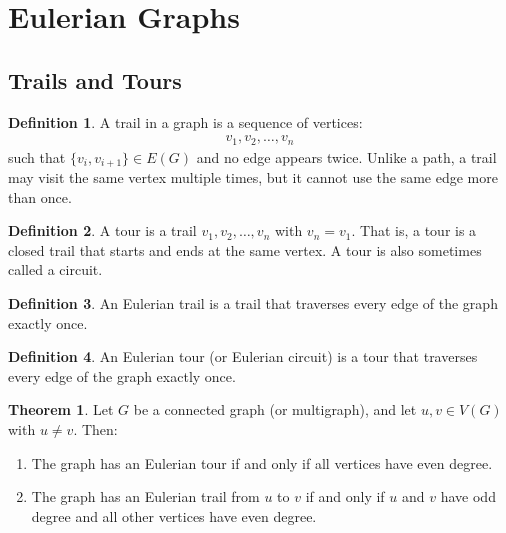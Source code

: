 \documentclass{article}
\theoremstyle{definition}
\newtheorem{theorem}{Theorem}
\newtheorem{definition}{Definition}
\begin{document}
\clearpage
\section{Eulerian Graphs}

\subsection{Trails and Tours}

\begin{definition}
A trail in a graph is a sequence of vertices:
\begin{align*}
v_1, v_2, \ldots, v_n
\end{align*}
such that $\{v_i, v_{i+1}\} \in E(G)$ and no edge appears twice. Unlike a path, a trail may visit the same vertex multiple times, but it cannot use the same edge more than once.
\end{definition}

\begin{definition}
A tour is a trail $v_1, v_2, \ldots, v_n$ with $v_n = v_1$. That is, a tour is a closed trail that starts and ends at the same vertex. A tour is also sometimes called a circuit.
\end{definition}

\begin{definition}
An Eulerian trail is a trail that traverses every edge of the graph exactly once.
\end{definition}

\begin{definition}
An Eulerian tour (or Eulerian circuit) is a tour that traverses every edge of the graph exactly once.
\end{definition}

\begin{theorem}
Let $G$ be a connected graph (or multigraph), and let $u, v \in V(G)$ with $u \neq v$. Then:
\begin{enumerate}
\item The graph has an Eulerian tour if and only if all vertices have even degree.
\item The graph has an Eulerian trail from $u$ to $v$ if and only if $u$ and $v$ have odd degree and all other vertices have even degree.
\end{enumerate}
\end{theorem}
\end{document}
